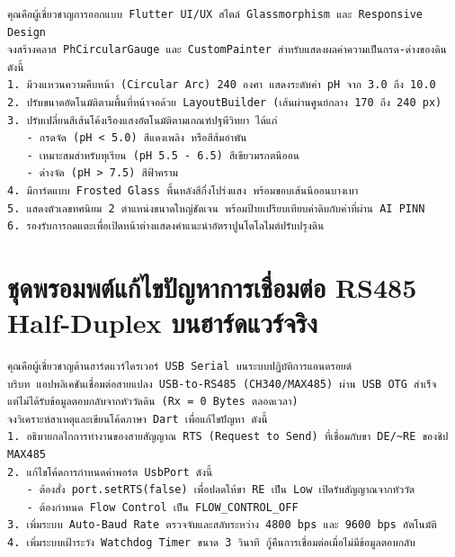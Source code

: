 \begin{promptbox}[title={พรอมพต์ ก.4 การสร้างวิดเจ็ตมาตรวัด pH ทรงกลม CustomPainter แบบ Responsive}]
\begin{lstlisting}
คุณคือผู้เชี่ยวชาญการออกแบบ Flutter UI/UX สไตล์ Glassmorphism และ Responsive Design
จงสร้างคลาส PhCircularGauge และ CustomPainter สำหรับแสดงผลค่าความเป็นกรด-ด่างของดิน ดังนี้
1. มีวงแหวนความคืบหน้า (Circular Arc) 240 องศา แสดงระดับค่า pH จาก 3.0 ถึง 10.0
2. ปรับขนาดอัตโนมัติตามพื้นที่หน้าจอด้วย LayoutBuilder (เส้นผ่านศูนย์กลาง 170 ถึง 240 px)
3. ปรับเปลี่ยนสีเส้นโค้งเรืองแสงอัตโนมัติตามเกณฑ์ปฐพีวิทยา ได้แก่
   - กรดจัด (pH < 5.0) สีแดงเพลิง หรือสีส้มอำพัน
   - เหมาะสมสำหรับทุเรียน (pH 5.5 - 6.5) สีเขียวมรกตนีออน
   - ด่างจัด (pH > 7.5) สีฟ้าคราม
4. มีการ์ดแบบ Frosted Glass พื้นหลังสีกึ่งโปร่งแสง พร้อมขอบเส้นนีออนบางเบา
5. แสดงตัวเลขทศนิยม 2 ตำแหน่งขนาดใหญ่ชัดเจน พร้อมป้ายเปรียบเทียบค่าดิบกับค่าที่ผ่าน AI PINN
6. รองรับการกดแตะเพื่อเปิดหน้าต่างแสดงคำแนะนำอัตราปูนโดโลไมต์ปรับปรุงดิน
\end{lstlisting}
\end{promptbox}

\section{ชุดพรอมพต์แก้ไขปัญหาการเชื่อมต่อ RS485 Half-Duplex บนฮาร์ดแวร์จริง}

\begin{promptbox}[title={พรอมพต์ ก.5 การแก้ปัญหาสายแปลง USB-RS485 มิวต์ตัวรับสัญญาณ (RTS DE/RE)}]
\begin{lstlisting}
คุณคือผู้เชี่ยวชาญด้านฮาร์ดแวร์ไดรเวอร์ USB Serial บนระบบปฏิบัติการแอนดรอยด์
บริบท แอปพลิเคชันเชื่อมต่อสายแปลง USB-to-RS485 (CH340/MAX485) ผ่าน USB OTG สำเร็จ
แต่ไม่ได้รับข้อมูลตอบกลับจากหัววัดดิน (Rx = 0 Bytes ตลอดเวลา)
จงวิเคราะห์สาเหตุและเขียนโค้ดภาษา Dart เพื่อแก้ไขปัญหา ดังนี้
1. อธิบายกลไกการทำงานของสายสัญญาณ RTS (Request to Send) ที่เชื่อมกับขา DE/~RE ของชิป MAX485
2. แก้ไขโค้ดการกำหนดค่าพอร์ต UsbPort ดังนี้
   - ต้องสั่ง port.setRTS(false) เพื่อปลดให้ขา RE เป็น Low เปิดรับสัญญาณจากหัววัด
   - ต้องกำหนด Flow Control เป็น FLOW_CONTROL_OFF
3. เพิ่มระบบ Auto-Baud Rate ตรวจจับและสลับระหว่าง 4800 bps และ 9600 bps อัตโนมัติ
4. เพิ่มระบบเฝ้าระวัง Watchdog Timer ขนาด 3 วินาที กู้คืนการเชื่อมต่อเมื่อไม่มีข้อมูลตอบกลับ
\end{lstlisting}
\end{promptbox}
